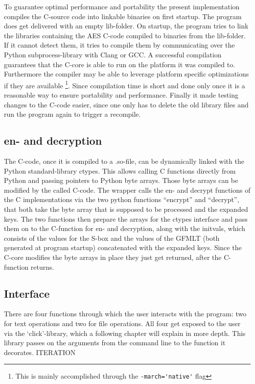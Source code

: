 To guarantee optimal performance and portability the present
implementation compiles the C-source code into linkable binaries on
first startup. The program does get delivered with an empty lib-folder.
On startup, the program tries to link the libraries containing the AES
C-code compiled to binaries from the lib-folder. If it cannot detect
them, it tries to compile them by communicating over the Python
subprocess-library with Clang or GCC. A successful compilation
guarantees that the C-core is able to run on the platform it was
compiled to. Furthermore the compiler may be able to leverage platform
specific optimizations if they are available \footnote{This is mainly accomplished through the \lstinline{-march='native'} flag}. Since compilation time is
short and done only once it is a reasonable way to ensure portability
and performance. Finally it made testing changes to the C-code easier,
since one only has to delete the old library files and run the program
again to trigger a recompile.

\hypertarget{en--and-decryption}{%
\subsection{en- and decryption}\label{en--and-decryption}}

The C-code, once it is compiled to a .so-file, can be dynamically linked
with the Python standard-library ctypes. This allows calling C functions
directly from Python and passing pointers to Python byte arrays. Those
byte arrays can be modified by the called C-code. The wrapper
calls the en- and decrypt functions of the C implementations via the two
python functions ``encrypt'' and ``decrypt'', that both take the byte
array that is supposed to be processed and the expanded keys. The two
functions then prepare the arrays for the ctypes interface and pass them
on to the C-function for en- and decryption, along with the initvals,
which consists of the values for the S-box and the values of the GFMLT
(both generated at program startup) concatenated with the expanded keys.
Since the C-core modifies the byte arrays in place they just get
returned, after the C-function returns.

\hypertarget{interface}{%
\subsection{Interface}\label{interface}}

There are four functions through which the user interacts with the
program: two for text operations and two for file operations. All four
get exposed to the user via the `click'-library, which a following
chapter will explain in more depth. This library passes on the arguments
from the command line to the function it decorates. ITERATION

